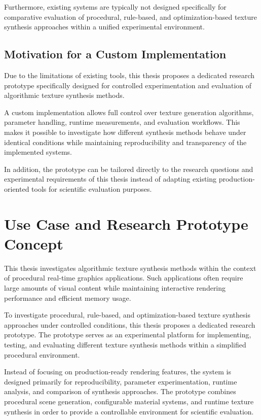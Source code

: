 \clearpage
Furthermore, existing systems are typically not designed specifically for comparative evaluation of procedural, rule-based, and optimization-based texture synthesis approaches within a unified experimental environment.

\subsection{Motivation for a Custom Implementation}

Due to the limitations of existing tools, this thesis proposes a dedicated research prototype specifically designed for controlled experimentation and evaluation of algorithmic texture synthesis methods.

A custom implementation allows full control over texture generation algorithms, parameter handling, runtime measurements, and evaluation workflows. This makes it possible to investigate how different synthesis methods behave under identical conditions while maintaining reproducibility and transparency of the implemented systems.

In addition, the prototype can be tailored directly to the research questions and experimental requirements of this thesis instead of adapting existing production-oriented tools for scientific evaluation purposes.

\section{Use Case and Research Prototype Concept}

This thesis investigates algorithmic texture synthesis methods within the context of procedural real-time graphics applications. Such applications often require large amounts of visual content while maintaining interactive rendering performance and efficient memory usage.

To investigate procedural, rule-based, and optimization-based texture synthesis approaches under controlled conditions, this thesis proposes a dedicated research prototype. The prototype serves as an experimental platform for implementing, testing, and evaluating different texture synthesis methods within a simplified procedural environment.

Instead of focusing on production-ready rendering features, the system is designed primarily for reproducibility, parameter experimentation, runtime analysis, and comparison of synthesis approaches. The prototype combines procedural scene generation, configurable material systems, and runtime texture synthesis in order to provide a controllable environment for scientific evaluation.


